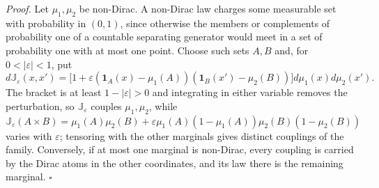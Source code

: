 \noindent\emph{Proof.}
Let $\mu_1,\mu_2$ be non-Dirac. A non-Dirac law charges some measurable set with probability in $(0,1)$,
since otherwise the members or complements of probability one of a countable separating generator would
meet in a set of probability one with at most one point. Choose such sets $A,B$ and, for
$0<|\varepsilon|<1$, put
\begin{equation}
d\mathbb J_\varepsilon(x,x')
=\bigl[1+\varepsilon(\mathbf 1_A(x)-\mu_1(A))(\mathbf 1_B(x')-\mu_2(B))\bigr]d\mu_1(x)d\mu_2(x').
\label{eq:prob-coupling-perturbation}
\end{equation}
The bracket is at least $1-|\varepsilon|>0$ and integrating in either variable removes the perturbation,
so $\mathbb J_\varepsilon$ couples $\mu_1,\mu_2$, while
$\mathbb J_\varepsilon(A\times B)=\mu_1(A)\mu_2(B)+\varepsilon\mu_1(A)(1-\mu_1(A))\mu_2(B)(1-\mu_2(B))$
varies with $\varepsilon$; tensoring with the other marginals gives distinct couplings of the family.
Conversely, if at most one marginal is non-Dirac, every coupling is carried by the Dirac atoms in the
other coordinates, and its law there is the remaining marginal. \hfill$\square$

